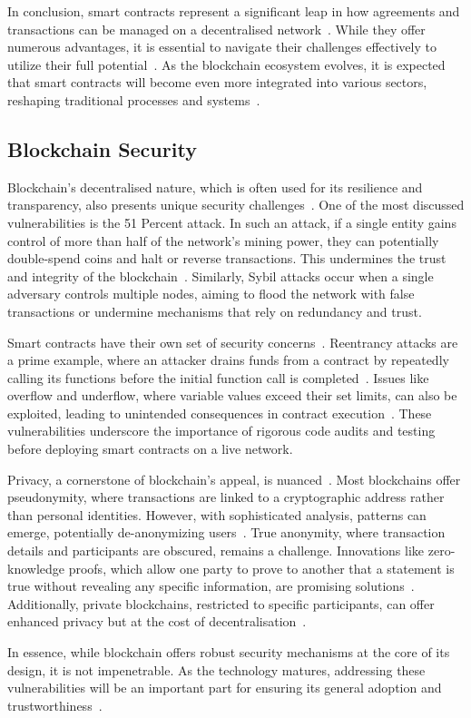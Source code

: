 In conclusion, smart contracts represent a significant leap in how agreements and transactions can be managed on a decentralised network~\cite{.2019}. While they offer numerous advantages, it is essential to navigate their challenges effectively to utilize their full potential~\cite{.2019}. As the blockchain ecosystem evolves, it is expected that smart contracts will become even more integrated into various sectors, reshaping traditional processes and systems~\cite{.2019}.

\subsection{Blockchain Security}
Blockchain's decentralised nature, which is often used for its resilience and transparency, also presents unique security challenges~\cite{Leng.2022}. One of the most discussed vulnerabilities is the 51 Percent attack. In such an attack, if a single entity gains control of more than half of the network's mining power, they can potentially double-spend coins and halt or reverse transactions. This undermines the trust and integrity of the blockchain~\cite{Singh.2021}. Similarly, Sybil attacks occur when a single adversary controls multiple nodes, aiming to flood the network with false transactions or undermine mechanisms that rely on redundancy and trust.

Smart contracts have their own set of security concerns~\cite{Alkhalifah.2021}. Reentrancy attacks are a prime example, where an attacker drains funds from a contract by repeatedly calling its functions before the initial function call is completed~\cite{Alkhalifah.2021}. Issues like overflow and underflow, where variable values exceed their set limits, can also be exploited, leading to unintended consequences in contract execution~\cite{Guo.2022}. These vulnerabilities underscore the importance of rigorous code audits and testing before deploying smart contracts on a live network.

Privacy, a cornerstone of blockchain's appeal, is nuanced~\cite{Kus.2022}. Most blockchains offer pseudonymity, where transactions are linked to a cryptographic address rather than personal identities. However, with sophisticated analysis, patterns can emerge, potentially de-anonymizing users~\cite{Kus.2022}. True anonymity, where transaction details and participants are obscured, remains a challenge. Innovations like zero-knowledge proofs, which allow one party to prove to another that a statement is true without revealing any specific information, are promising solutions~\cite{Deng.2021}. Additionally, private blockchains, restricted to specific participants, can offer enhanced privacy but at the cost of decentralisation~\cite{Deng.2021}.

In essence, while blockchain offers robust security mechanisms at the core of its design, it is not impenetrable. As the technology matures, addressing these vulnerabilities will be an important part for ensuring its general adoption and trustworthiness~\cite{Singh.2021}.
